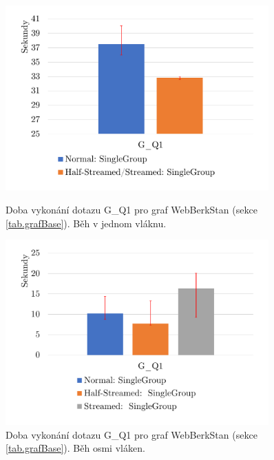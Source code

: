 \begin{figure}[!htp]
    \centering
    \begin{minipage}{0.45\textwidth}
        \centering
        \includegraphics[width=0.9\textwidth]{../img/webberkstanGroupByQ1ST.pdf} %
        \caption{Doba vykonání dotazu G\_Q1 pro graf WebBerkStan (sekce \ref{tab.grafBase}). Běh v jednom vláknu.}
        \label{figure.webberkstanGQ1ST}
    \end{minipage}\hfill
    \begin{minipage}{0.45\textwidth}
        \centering
        \includegraphics[width=0.9\textwidth]{../img/webberkstanGroupByQ1Par.pdf} %
        \caption{Doba vykonání dotazu G\_Q1 pro graf WebBerkStan (sekce \ref{tab.grafBase}). Běh osmi vláken.}
        \label{figure.webberkstanGQ1Par}
    \end{minipage}
\end{figure}
\clearpage
